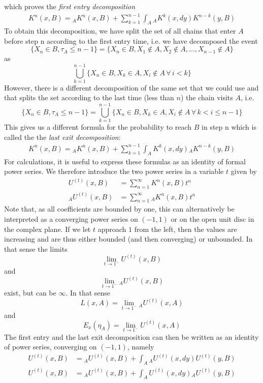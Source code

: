 \documentclass[a4paper, draft]{article}
\theoremstyle{own}
\theoremstyle{remark}
\begin{document}
which proves the {\em first entry decomposition}
\begin{align}\label{eq:firstentrydecomposition}
K^n(x,B) = {_A}K^n(x,B) + \sum_{k=1}^{n-1} \int_{A} {_A}K^k(x,dy) K^{n-k}(y, B)
\end{align}
To obtain this decomposition, we have split the set of all chains that enter $A$ before step n according to the first entry time, i.e. we have decomposed the event
$$
\{ X_n \in B, \tau_A \leq n-1 \} =
\{ X_n \in B, X_1 \notin A, X_2 \notin A, \dots, X_{n-1} \notin A \}
$$
as
$$
\bigcup_{k=1}^{n-1} \{ X_n \in B,  X_k \in A, X_i \notin A \, \forall \, i < k \}
$$
However, there is a different decomposition of the same set that we could use and that splits the set according to the last time (less than $n$) the chain visits $A$, i.e.
$$
\{ X_n \in B, \tau_A \leq n-1 \} = 
\bigcup_{k=1}^{n-1} \{ X_n \in B,  X_k \in A, X_i \notin A \, \forall \, k < i \leq n-1 \}
$$
This gives us a different formula for the probability to reach $B$ in step n which is called the the {\em last exit decomposition}:
\begin{align}\label{eq:lastexitdecomposition}
K^n(x,B) = {_A}K^n(x,B) + \sum_{k=1}^{n-1} \int_{A} K^k(x, dy) {_A}K^{n-k}(y,B) 
\end{align}
For calculations, it is useful to express these formulas as an identity of formal power series. We therefore introduce the two power series in a variable $t$ given by
\begin{align*}
U^{(t)}(x,B) &= \sum_{n=1}^\infty K^n(x,B) t^n \\
{_A}U^{(t)}(x,B) &= \sum_{n=1}^\infty {_A}K^n(x,B) t^n
\end{align*}
Note that, as all coefficients are bounded by one, this can alternatively be interpreted as a
converging power series on $(-1,1)$ or on the open unit disc in the complex plane. If we let $t$ approach $1$ from the left, then the values are increasing and are thus either bounded (and then converging) or unbounded. In that sense the limits
$$
\lim_{t \rightarrow 1^-} U^{(t)}(x,B)
$$
and
$$
\lim_{t \rightarrow 1^-} {_A}U^{(t)}(x,B)
$$
exist, but can be $\infty$. In that sense
$$
L(x,A) = \lim_{t \rightarrow 1^-} {_A}U^{(t)}(x,A)
$$
and
$$
E_x(\eta_A) = \lim_{t \rightarrow 1^-} U^{(t)}(x,A)
$$
The first entry and the last exit decomposition can then be written as an identity of
power series, converging on $(-1,1)$, namely
\begin{align*}
U^{(t)}(x,B) &= {_A}U^{(t)}(x,B) + 
\int_{A} {_A}U^{(t)}(x,dy) U^{(t)}(y, B) \\
U^{(t)}(x,B) &= {_A}U^{(t)}(x,B) + 
\int_{A} U^{(t)}(x, dy) {_A}U^{(t)}(y,B) 
\end{align*}
\end{document}

